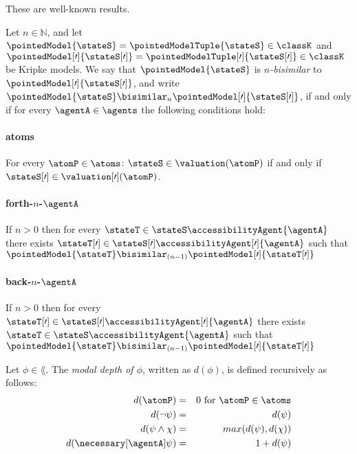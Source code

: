 \documentclass[twoside]{aiml14}
\begin{document}
  These are well-known results.

  \begin{definition}
      Let $n \in \mathbb{N}$, 
      and let $\pointedModel{\stateS} = \pointedModelTuple{\stateS} \in \classK$ 
      and $\pointedModel[\prime]{\stateS[\prime]} = \pointedModelTuple[\prime]{\stateS[\prime]} \in \classK$ be Kripke models.
      We say that $\pointedModel{\stateS}$ is {\em $n$-bisimilar} 
      to $\pointedModel[\prime]{\stateS[\prime]}$,
      and write $\pointedModel{\stateS} \bisimilar_n \pointedModel[\prime]{\stateS[\prime]}$,
      if and only if for every $\agentA \in \agents$ the following conditions hold:

      \paragraph{atoms}
      For every $\atomP \in \atoms$: $\stateS \in \valuation(\atomP)$ if and only if $\stateS[\prime] \in \valuation[\prime](\atomP)$.

      \paragraph{forth-$n$-$\agentA$}
      If $n > 0$ then
      for every $\stateT \in \stateS \accessibilityAgent{\agentA}$ 
      there exists $\stateT[\prime] \in \stateS[\prime] \accessibilityAgent[\prime]{\agentA}$
      such that $\pointedModel{\stateT} \bisimilar_{(n - 1)} \pointedModel[\prime]{\stateT[\prime]}$ 

      \paragraph{back-$n$-$\agentA$}
      If $n > 0$ then
      for every $\stateT[\prime] \in \stateS[\prime] \accessibilityAgent[\prime]{\agentA}$
      there exists $\stateT \in \stateS \accessibilityAgent{\agentA}$ 
      such that $\pointedModel{\stateT} \bisimilar_{(n - 1)} \pointedModel[\prime]{\stateT[\prime]}$ 
  \end{definition}

  \begin{definition}
      Let $\phi \in \lang$. The {\em modal depth of $\phi$}, written as $d(\phi)$, is defined recursively as follows:
      \begin{eqnarray*}
          d(\atomP) &=& 0 \text{ for } \atomP \in \atoms\\
          d(\neg \psi) &=& d(\psi)\\
          d(\psi \land \chi) &=& max(d(\psi), d(\chi))\\
          d(\necessary[\agentA] \psi) &=& 1 + d(\psi)
      \end{eqnarray*}
  \end{definition}
\end{document}
